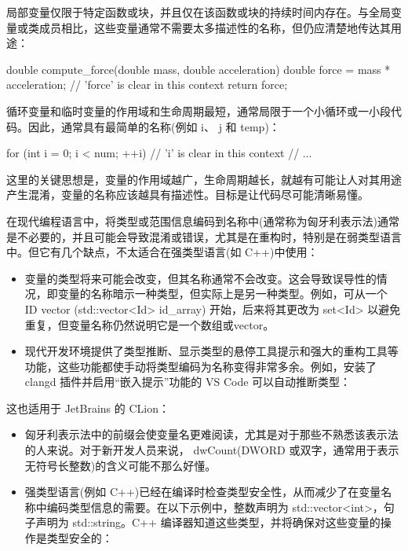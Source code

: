 局部变量仅限于特定函数或块，并且仅在该函数或块的持续时间内存在。与全局变量或类成员相比，这些变量通常不需要太多描述性的名称，但仍应清楚地传达其用途：

\begin{cpp}
double compute_force(double mass, double acceleration) {
    double force = mass * acceleration; // 'force' is clear in this context
    return force;
}
\end{cpp}

循环变量和临时变量的作用域和生命周期最短，通常局限于一个小循环或一小段代码。因此，通常具有最简单的名称(例如 i、 j 和 temp)：

\begin{cpp}
for (int i = 0; i < num; ++i) { // 'i' is clear in this context
    // ...
}
\end{cpp}

这里的关键思想是，变量的作用域越广，生命周期越长，就越有可能让人对其用途产生混淆，变量的名称应该越具有描述性。目标是让代码尽可能清晰易懂。


在现代编程语言中，将类型或范围信息编码到名称中(通常称为匈牙利表示法)通常是不必要的，并且可能会导致混淆或错误，尤其是在重构时，特别是在弱类型语言中。但它有几个缺点，不太适合在强类型语言(如 C++)中使用：

\begin{itemize}
\item
变量的类型将来可能会改变，但其名称通常不会改变。这会导致误导性的情况，即变量的名称暗示一种类型，但实际上是另一种类型。例如，可从一个 ID vector (std::vector<Id> id\_array) 开始，后来将其更改为 set<Id> 以避免重复，但变量名称仍然说明它是一个数组或vector。

\item
现代开发环境提供了类型推断、显示类型的悬停工具提示和强大的重构工具等功能，这些功能都使手动将类型编码为名称变得非常多余。例如，安装了 clangd 插件并启用“嵌入提示”功能的 VS Code 可以自动推断类型：


\end{itemize}

这也适用于 JetBrains 的 CLion：

\begin{itemize}
\item
匈牙利表示法中的前缀会使变量名更难阅读，尤其是对于那些不熟悉该表示法的人来说。对于新开发人员来说， dwCount(DWORD 或双字，通常用于表示无符号长整数)的含义可能不那么好懂。

\item
强类型语言(例如 C++)已经在编译时检查类型安全性，从而减少了在变量名称中编码类型信息的需要。在以下示例中，整数声明为 std::vector<int>，句子声明为 std::string。C++ 编译器知道这些类型，并将确保对这些变量的操作是类型安全的：
\end{itemize}

